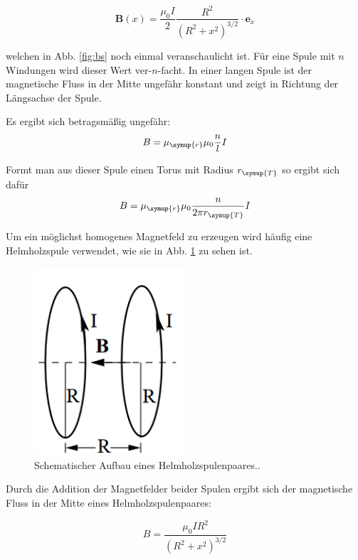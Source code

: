 \begin{equation}
  \symbf{B}(x)=\frac{\mu_0I}{2}\frac{R^2}{\left(R^2+x^2\right)^{3/2}}\cdot \symbf{e}_x
  \label{eqn:bswdg}
\end{equation}

welchen in Abb. \ref{fig:bs} noch einmal veranschaulicht ist.
Für eine Spule mit $n$ Windungen wird dieser Wert ver-$n$-facht.
In einer langen Spule ist der magnetische Fluss in der Mitte ungefähr
konstant und zeigt in Richtung der Längsachse der Spule.

Es ergibt sich betragsmäßig ungefähr:
\begin{equation}
  B = \mu_{\symup{r}}\mu_0\frac{n}{l}I
  \label{eqn:Bspule}
\end{equation}

Formt man aus dieser Spule einen Torus mit Radius $r_{\symup{T}}$
so ergibt sich dafür
\begin{equation}
  B = \mu_{\symup{r}}\mu_0\frac{n}{2\pi r_{\symup{T}}}I
  \label{eqn:Btorus}
\end{equation}

Um ein möglichst homogenes Magnetfeld zu erzeugen wird häufig
eine Helmholzspule verwendet, wie sie in Abb. \ref{fig:hh} zu sehen ist.

\begin{figure}
  \centering
  \includegraphics[width=0.5\textwidth]{content/images/KonzeptHelmholz.png}
  \caption{Schematischer Aufbau eines Helmholzspulenpaares.\cite{anleitung}.}
  \label{fig:hh}
\end{figure}

Durch die Addition der Magnetfelder beider Spulen ergibt sich
der magnetische Fluss in der Mitte eines Helmholzspulenpaares:

\begin{equation}
  B=\frac{\mu_0IR^2}{\left(R^2+x^2\right)^{3/2}}
\end{equation}

